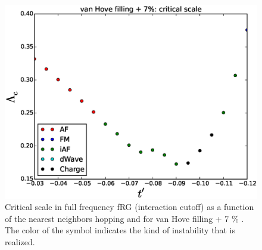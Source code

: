\begin{figure}
\includegraphics[scale=0.4]{vanHove_plus_scan_critical_lambda_phi.eps}
\caption{Critical scale in full frequency fRG (interaction cutoff) as a function of the nearest neighbors hopping and for van Hove filling + 7 \% . The color of the symbol indicates the kind of instability that is realized.} 
\end{figure}